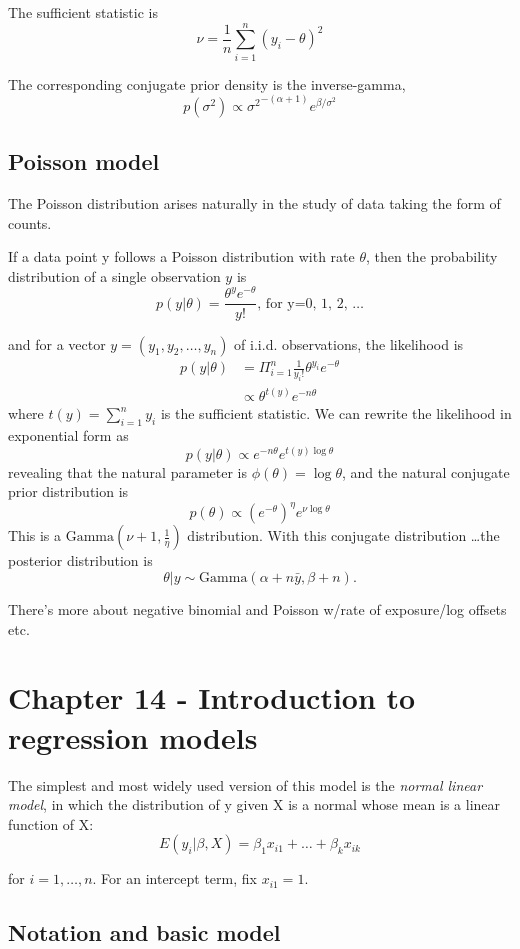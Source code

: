 \documentclass[11pt]{amsart}
\begin{document}
The sufficient statistic is
\[
\nu = \frac{1}{n} \sum_{i=1}^n (y_i - \theta)^2
\]

The corresponding conjugate prior density is the inverse-gamma,
\[
p(\sigma^2) \propto {\sigma^2}^{-(\alpha+1)} e^{\beta/\sigma^2}
\]

\subsection{Poisson model}
The Poisson distribution arises naturally in the study of data taking the form
of counts.

If a data point y follows a Poisson distribution with rate $\theta$, then the
probability distribution of a single observation $y$ is
\[
p(y|\theta) = \frac{\theta^y e^{-\theta}}{y!}\text{, for y=0, 1, 2, \ldots}
\]

and for a vector $y=(y_1, y_2, \ldots, y_n)$ of i.i.d. observations, the
likelihood is
\begin{align*}
p(y|\theta) &= \Pi_{i=1}^n \frac{1}{y_i!} \theta^{y_i} e^{-\theta} \\
& \propto \theta^{t(y)} e^{-n\theta}
\end{align*}
where $t(y) = \sum_{i=1}^n y_i$ is the sufficient statistic. We can rewrite
the likelihood in exponential form as
\[
p(y|\theta) \propto e^{-n\theta} e^{t(y) \log{\theta}}
\]
revealing that the natural parameter is $\phi(\theta) = \log{\theta}$, and
the natural conjugate prior distribution is
\[
	p(\theta) \propto (e^{-\theta})^\eta e^{\nu \log{\theta}}
\]
This is a $\text{Gamma}(\nu+ 1, \frac{1}{\eta})$ distribution. With this
conjugate distribution \ldots the posterior distribution is
\[
\theta|y \sim \text{Gamma}(\alpha + n\bar{y}, \beta+n).
\]

There's more about negative binomial and Poisson w/rate of exposure/log
offsets etc.

\section{Chapter 14 - Introduction to regression models}

The simplest and most widely used version of this model is the
\emph{normal linear model}, in which the distribution of y given X is a normal
whose mean is a linear function of X:
\[
	E(y_i|\beta, X) = \beta_1 x_{i1} + \ldots + \beta_k x_{ik}
\]

for $i = 1, \ldots, n$. For an intercept term, fix $x_{i1} = 1$.

\subsection{Notation and basic model}
\end{document}
